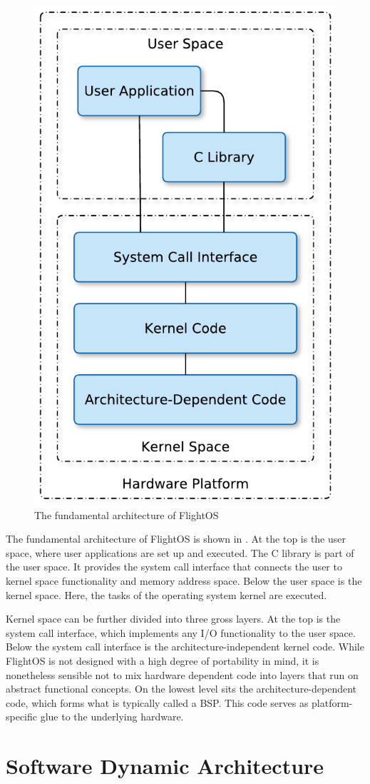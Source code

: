 \begin{figure}[htb]
\begin{center}
	\includegraphics[width=0.4\columnwidth]{images/OS_fundamental_architecture}
	\caption{The fundamental architecture of FlightOS}
	\label{fig:fundamental_architecture}
\end{center}
\end{figure}

The fundamental architecture of FlightOS is shown in
. At the top is the user space, where user
applications are set up and executed. The C library is part of the user space.
It provides the system call interface that connects the user to kernel space
functionality and memory address space. Below the user space is the kernel
space. Here, the tasks of the operating system kernel are executed.

Kernel space can be further divided into three gross layers. At the top is the
system call interface, which implements any I/O functionality to the user space.
Below the system call interface is the architecture-independent kernel code.
While FlightOS is not designed with a high degree of portability in mind, it is
nonetheless sensible not to mix hardware dependent code into layers that run
on abstract functional concepts. On the lowest level sits the
architecture-dependent code, which forms what is typically called a \gls{BSP}.
This code serves as platform-specific glue to the underlying hardware.


\section{Software Dynamic Architecture}

